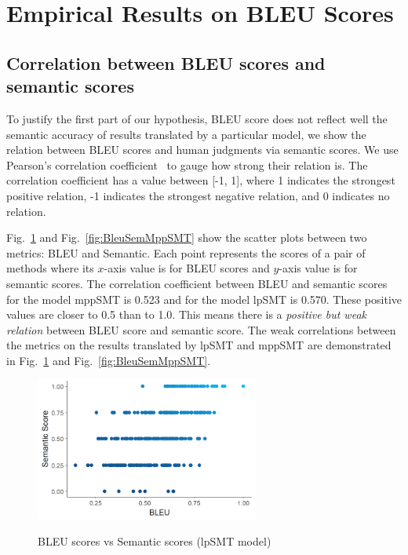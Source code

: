 \section{Empirical Results on BLEU Scores}
\label{sec:bleuresult}


\subsection{Correlation between BLEU scores and semantic scores}
To justify the first part of our hypothesis, BLEU score does not reflect well
the semantic accuracy of results translated by a particular model,
we show the relation between BLEU scores and human judgments via semantic scores.
We use Pearson's correlation coefficient~\cite{geek_2015} to gauge
how strong their relation is. The correlation coefficient has a value
between [-1, 1], where 1 indicates the strongest positive relation, -1
indicates the strongest negative relation, and 0 indicates no relation.

Fig.~\ref{fig:BleuSemlpSMT} and Fig.~\ref{fig:BleuSemMppSMT} show the
scatter plots between two metrics: BLEU and Semantic. Each point
represents the scores of a pair of methods where its $x$-axis value is
for BLEU scores and $y$-axis value is for semantic scores. The
correlation coefficient between BLEU and semantic scores for the model
mppSMT is 0.523 and for the model lpSMT is 0.570. These positive values
are closer to 0.5 than to 1.0. This means there is a {\em positive but weak
relation} between BLEU score and semantic score. The weak correlations %
between the metrics on the results translated by lpSMT and mppSMT are
demonstrated in Fig.~\ref{fig:BleuSemlpSMT} and Fig.~\ref{fig:BleuSemMppSMT}.



\begin{figure}
\caption{BLEU scores vs Semantic scores (lpSMT model)}
\centering
\includegraphics[width=2.9in]{img/bleuvssemantic_lpSMT.png}
\label{fig:BleuSemlpSMT}
\end{figure}

